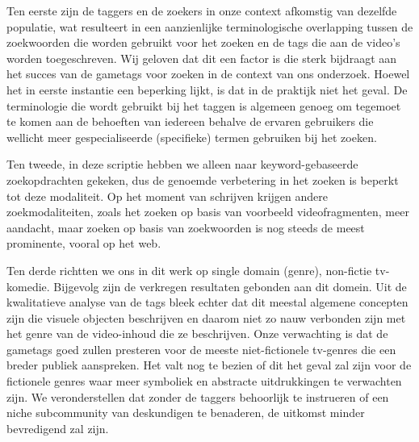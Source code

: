 Ten eerste zijn de taggers en de zoekers in onze context afkomstig van dezelfde populatie, wat resulteert in een aanzienlijke terminologische overlapping tussen de zoekwoorden die worden
gebruikt voor het zoeken en de tags die aan de video's worden toegeschreven. Wij geloven dat dit een factor is die sterk bijdraagt aan het succes van de gametags voor zoeken in de context van ons
onderzoek. Hoewel het in eerste instantie een beperking lijkt, is dat in de praktijk niet het geval. De terminologie die wordt gebruikt bij het taggen is algemeen genoeg om tegemoet te komen aan de
behoeften van iedereen behalve de ervaren gebruikers die wellicht meer gespecialiseerde (specifieke) termen gebruiken bij het zoeken.

Ten tweede, in deze scriptie hebben we alleen naar keyword-gebaseerde zoekopdrachten gekeken, dus de genoemde verbetering in het zoeken is beperkt tot deze modaliteit. Op het moment van schrijven krijgen andere zoekmodaliteiten, zoals het zoeken op basis van voorbeeld videofragmenten, meer aandacht, maar zoeken op basis van zoekwoorden is nog steeds de meest prominente, vooral op het web.

Ten derde richtten we ons in dit werk op single domain (genre), non-fictie tv-komedie. Bijgevolg zijn de verkregen resultaten gebonden aan dit domein. Uit de kwalitatieve analyse van de tags bleek
echter dat dit meestal algemene concepten zijn die visuele objecten beschrijven en daarom niet zo nauw verbonden zijn met het genre van de video-inhoud die ze beschrijven. Onze verwachting is dat
de gametags goed zullen presteren voor de meeste niet-fictionele tv-genres die een breder publiek aanspreken. Het valt nog te bezien of dit het geval zal zijn voor de fictionele genres waar meer
symboliek en abstracte uitdrukkingen te verwachten zijn. We veronderstellen dat zonder de taggers behoorlijk te instrueren of een niche subcommunity van deskundigen te benaderen, de uitkomst
minder bevredigend zal zijn.